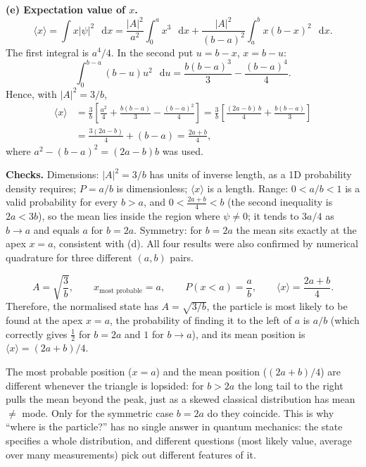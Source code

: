\documentclass[12pt]{article}
\renewcommand{\d}{\mathop{}\!\mathrm{d}}
\begin{document}
\begin{solutionbox}
\textbf{(e) Expectation value of $x$.}
\[
\langle x\rangle=\int x|\psi|^2\,\d x
=\frac{|A|^2}{a^2}\int_0^a x^3\,\d x+\frac{|A|^2}{(b-a)^2}\int_a^b x(b-x)^2\,\d x .
\]
The first integral is $a^4/4$. In the second put $u=b-x$, $x=b-u$:
\[
\int_0^{b-a}(b-u)u^2\,\d u=\frac{b(b-a)^3}{3}-\frac{(b-a)^4}{4}.
\]
Hence, with $|A|^2=3/b$,
\begin{align*}
\langle x\rangle
&=\frac{3}{b}\left[\frac{a^2}{4}+\frac{b(b-a)}{3}-\frac{(b-a)^2}{4}\right]
=\frac{3}{b}\left[\frac{(2a-b)\,b}{4}+\frac{b(b-a)}{3}\right]\\
&=\frac{3(2a-b)}{4}+(b-a)=\frac{2a+b}{4},
\end{align*}
where $a^2-(b-a)^2=(2a-b)b$ was used.

\textbf{Checks.} Dimensions: $|A|^2=3/b$ has units of inverse length, as a 1D probability density requires; $P=a/b$ is dimensionless; $\langle x\rangle$ is a length. Range: $0<a/b<1$ is a valid probability for every $b>a$, and $0<\tfrac{2a+b}{4}<b$ (the second inequality is $2a<3b$), so the mean lies inside the region where $\psi\neq0$; it tends to $3a/4$ as $b\to a$ and equals $a$ for $b=2a$. Symmetry: for $b=2a$ the mean sits exactly at the apex $x=a$, consistent with (d). All four results were also confirmed by numerical quadrature for three different $(a,b)$ pairs.
\end{solutionbox}

\begin{answerbox}
\[
A=\sqrt{\frac{3}{b}},\qquad x_{\text{most probable}}=a,\qquad P(x<a)=\frac{a}{b},\qquad \langle x\rangle=\frac{2a+b}{4}.
\]
Therefore, the normalised state has $A=\sqrt{3/b}$, the particle is most likely to be found at the apex $x=a$, the probability of finding it to the left of $a$ is $a/b$ (which correctly gives $\tfrac12$ for $b=2a$ and $1$ for $b\to a$), and its mean position is $\langle x\rangle=(2a+b)/4$.
\end{answerbox}

\begin{insightbox}
The most probable position ($x=a$) and the mean position ($(2a+b)/4$) are different whenever the triangle is lopsided: for $b>2a$ the long tail to the right pulls the mean beyond the peak, just as a skewed classical distribution has mean $\neq$ mode. Only for the symmetric case $b=2a$ do they coincide. This is why ``where is the particle?'' has no single answer in quantum mechanics: the state specifies a whole distribution, and different questions (most likely value, average over many measurements) pick out different features of it.
\end{insightbox}
\fi
\end{document}
